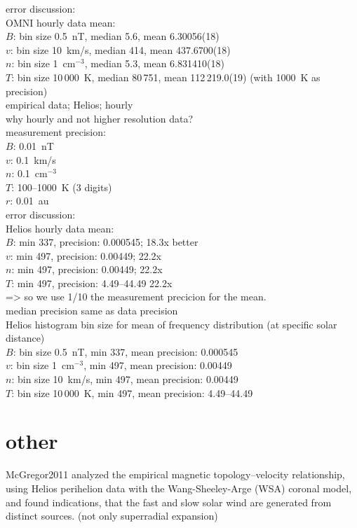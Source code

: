error discussion:\\
OMNI hourly data mean:\\
$B$: bin size 0.5~nT, median 5.6, mean 6.30056(18)\\
$v$: bin size 10~km/s, median 414, mean 437.6700(18)\\
$n$: bin size 1~cm$^{-3}$, median 5.3, mean 6.831410(18)\\
$T$: bin size 10\,000~K, median 80\,751, mean 112\,219.0(19) (with 1000~K as precision)\\

empirical data; Helios; hourly\\
why hourly and not higher resolution data?\\
measurement precision:\\
$B$: 0.01~nT\\
$v$: 0.1~km/s\\
$n$: 0.1~cm$^{-3}$\\
$T$: 100--1000~K (3 digits)\\
$r$: 0.01~au\\

error discussion:\\
Helios hourly data mean:\\
$B$: min 337, precision: 0.000545; 18.3x better\\
$v$: min 497, precision: 0.00449; 22.2x\\
$n$: min 497, precision:  0.00449; 22.2x\\
$T$: min 497, precision: 4.49--44.49 22.2x\\
=> so we use 1/10 the measurement precicion for the mean.\\

median precision same as data precision\\

Helios histogram bin size for mean of frequency distribution (at specific solar distance)\\
$B$: bin size 0.5~nT, min 337, mean precision: 0.000545\\
$v$: bin size 1~cm$^{-3}$, min 497, mean precision: 0.00449\\
$n$: bin size 10~km/s, min 497, mean precision:  0.00449\\
$T$: bin size 10\,000~K, min 497, mean precision: 4.49--44.49\\


\section{other}
McGregor2011 analyzed the empirical magnetic topology–velocity relationship, using Helios perihelion data with the Wang-Sheeley-Arge (WSA) coronal model, and found indications, that the fast and slow solar wind are generated from distinct sources. (not only superradial expansion)\\

